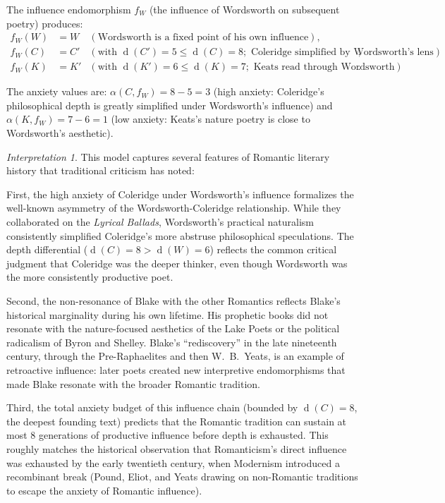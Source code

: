 \documentclass[11pt,openany]{book}
\theoremstyle{definition}
\theoremstyle{plain}
\theoremstyle{remark}
\newtheorem{interpretation}[axiom]{Interpretation}
\newcommand{\depth}{\operatorname{d}}       %
\begin{document}
The influence endomorphism $f_W$ (the influence of Wordsworth on subsequent poetry) produces:
\begin{align*}
f_W(W) &= W & (\text{Wordsworth is a fixed point of his own influence}), \\
f_W(C) &= C' & (\text{with } \depth(C') = 5 \leq \depth(C) = 8; \text{ Coleridge simplified by Wordsworth's lens}), \\
f_W(K) &= K' & (\text{with } \depth(K') = 6 \leq \depth(K) = 7; \text{ Keats read through Wordsworth}).
\end{align*}

The anxiety values are: $\alpha(C, f_W) = 8 - 5 = 3$ (high anxiety: Coleridge's philosophical depth is greatly simplified under Wordsworth's influence) and $\alpha(K, f_W) = 7 - 6 = 1$ (low anxiety: Keats's nature poetry is close to Wordsworth's aesthetic).

\begin{interpretation}
This model captures several features of Romantic literary history that traditional criticism has noted:

First, the high anxiety of Coleridge under Wordsworth's influence formalizes the well-known asymmetry of the Wordsworth-Coleridge relationship. While they collaborated on the \emph{Lyrical Ballads}, Wordsworth's practical naturalism consistently simplified Coleridge's more abstruse philosophical speculations. The depth differential ($\depth(C) = 8 > \depth(W) = 6$) reflects the common critical judgment that Coleridge was the deeper thinker, even though Wordsworth was the more consistently productive poet.

Second, the non-resonance of Blake with the other Romantics reflects Blake's historical marginality during his own lifetime. His prophetic books did not resonate with the nature-focused aesthetics of the Lake Poets or the political radicalism of Byron and Shelley. Blake's ``rediscovery'' in the late nineteenth century, through the Pre-Raphaelites and then W.~B.~Yeats, is an example of retroactive influence: later poets created new interpretive endomorphisms that made Blake resonate with the broader Romantic tradition.

Third, the total anxiety budget of this influence chain (bounded by $\depth(C) = 8$, the deepest founding text) predicts that the Romantic tradition can sustain at most 8 generations of productive influence before depth is exhausted. This roughly matches the historical observation that Romanticism's direct influence was exhausted by the early twentieth century, when Modernism introduced a recombinant break (Pound, Eliot, and Yeats drawing on non-Romantic traditions to escape the anxiety of Romantic influence).
\end{interpretation}
\end{document}
